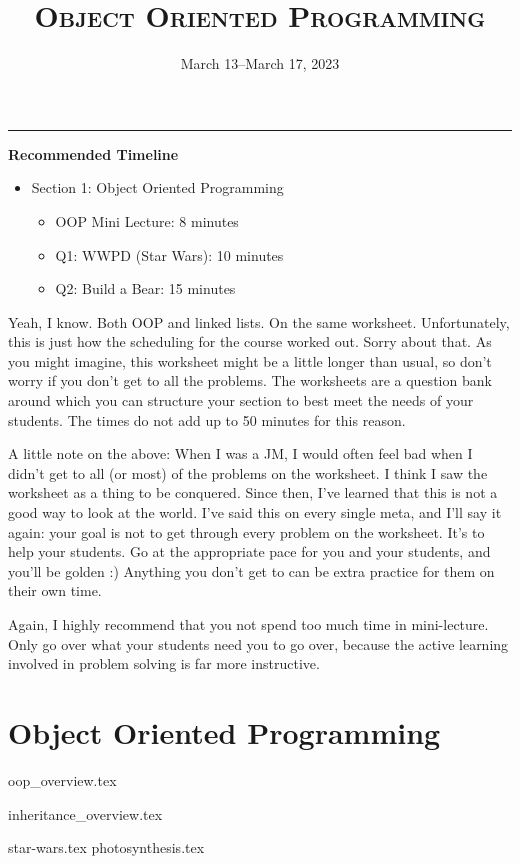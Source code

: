 \documentclass{exam}
\title{\textsc{Object Oriented Programming}}
\date{March 13--March 17, 2023}
\begin{document}
	\maketitle
	\rule{\textwidth}{0.15em}
	\fontsize{12}{15}\selectfont

\begin{meta}
	\textbf{Recommended Timeline}
	\begin{itemize}
		\item Section 1: Object Oriented Programming
		\begin{itemize}
		\item OOP Mini Lecture: 8 minutes
		\item Q1: WWPD (Star Wars): 10 minutes
		\item Q2: Build a Bear: 15 minutes
		\end{itemize}
	\end{itemize}
Yeah, I know. Both OOP and linked lists. On the same worksheet. Unfortunately, this is just how the scheduling for the course worked out. Sorry about that. As you might imagine, this worksheet might be a little longer than usual, so don't worry if you don't get to all the problems. The worksheets are a question bank around which you can structure your section to best meet the needs of your students. The times do not add up to 50 minutes for this reason. 

A little note on the above: When I was a JM, I would often feel bad when I didn't get to all (or most) of the problems on the worksheet. I think I saw the worksheet as a thing to be conquered. Since then, I've learned that this is not a good way to look at the world. I've said this on every single meta, and I'll say it again: your goal is not to get through every problem on the worksheet. It's to help your students. Go at the appropriate pace for you and your students, and you'll be golden :) Anything you don't get to can be extra practice for them on their own time. 

Again, I highly recommend that you not spend too much time in mini-lecture. Only go over what your students need you to go over, because the active learning involved in problem solving is far more instructive. 

\end{meta}

\section{Object Oriented Programming}
{oop_overview.tex}

{inheritance_overview.tex}

\newpage
\begin{questions}
{star-wars.tex}
\newpage
{photosynthesis.tex}
\end{questions}
\end{document}
